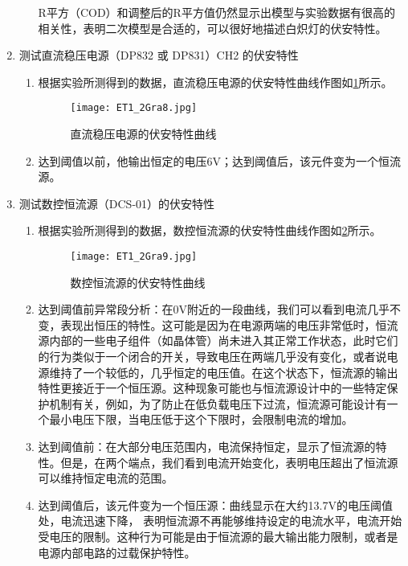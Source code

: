 \documentclass[dvipsnames, svgnames,a4paper,11pt]{article}
\begin{document}
\begin{enumerate}
\begin{enumerate}
			R平方（COD）和调整后的R平方值仍然显示出模型与实验数据有很高的相关性，表明二次模型是合适的，可以很好地描述白炽灯的伏安特性。
		\end{enumerate}
				
		\item 测试直流稳压电源（DP832 或 DP831）CH2 的伏安特性
		\begin{enumerate}
			\item 根据实验所测得到的数据，直流稳压电源的伏安特性曲线作图如\cref{fig:fig8}所示。
			
			\begin{figure}[htbp]
				\centering
				\texttt{[image: ET1\_2Gra8.jpg]}
				\caption{直流稳压电源的伏安特性曲线}
				\label{fig:fig8}
			\end{figure}
			
			\item 达到阈值以前，他输出恒定的电压6V；达到阈值后，该元件变为一个恒流源。
		\end{enumerate}
				
		\item 测试数控恒流源（DCS-01）的伏安特性
		\begin{enumerate}
			\item 根据实验所测得到的数据，数控恒流源的伏安特性曲线作图如\cref{fig:fig9}所示。
			
			\begin{figure}[htbp]
				\centering
				\texttt{[image: ET1\_2Gra9.jpg]}
				\caption{数控恒流源的伏安特性曲线}
				\label{fig:fig9}
			\end{figure}
			
			\item 达到阈值前异常段分析：在0V附近的一段曲线，我们可以看到电流几乎不变，表现出恒压的特性。这可能是因为在电源两端的电压非常低时，恒流源内部的一些电子组件（如晶体管）尚未进入其正常工作状态，此时它们的行为类似于一个闭合的开关，导致电压在两端几乎没有变化，或者说电源维持了一个较低的，几乎恒定的电压值。在这个状态下，恒流源的输出特性更接近于一个恒压源。这种现象可能也与恒流源设计中的一些特定保护机制有关，例如，为了防止在低负载电压下过流，恒流源可能设计有一个最小电压下限，当电压低于这个下限时，会限制电流的增加。
			
			\item 达到阈值前：在大部分电压范围内，电流保持恒定，显示了恒流源的特性。但是，在两个端点，我们看到电流开始变化，表明电压超出了恒流源可以维持恒定电流的范围。
			
			\item 达到阈值后，该元件变为一个恒压源：曲线显示在大约13.7V的电压阈值处，电流迅速下降，
			表明恒流源不再能够维持设定的电流水平，电流开始受电压的限制。这种行为可能是由于恒流源的最大输出能力限制，或者是电源内部电路的过载保护特性。
		\end{enumerate}
		
	\end{enumerate}
	
\end{document}
